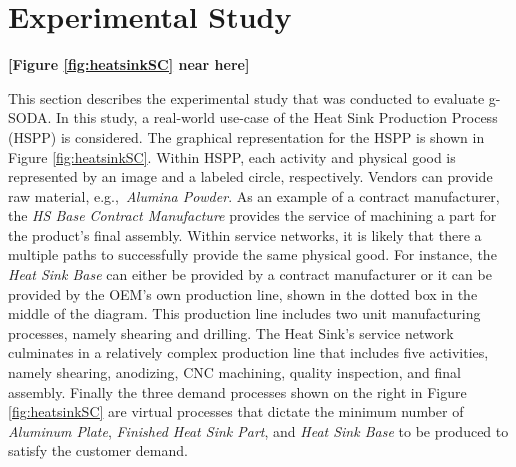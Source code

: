 \documentclass[a4paper, 12pt]{article} %
\begin{document}
\section{Experimental Study}
\label{sec:expResults}

\textbf{[Figure \ref{fig:heatsinkSC} near here]}


This section describes the experimental study that was conducted to evaluate g-SODA. 
In this study, a real-world use-case of the Heat Sink Production Process (HSPP) is considered.
The graphical representation for the HSPP is shown in Figure \ref{fig:heatsinkSC}.
Within HSPP, each activity and physical good is represented by an image and a labeled circle, respectively.  Vendors can provide raw material, e.g.,\ \textit{Alumina Powder}.
As an example of a contract manufacturer, the \textit{HS Base Contract Manufacture} provides the service of machining a part for the product's final assembly.  
Within service networks, it is likely that there a multiple paths to successfully provide the same physical good. 
For instance, the \textit{Heat Sink Base} can either be provided by a contract manufacturer or it can be provided by the OEM's own production line, shown in the dotted box in the middle of the diagram.  This production line includes two unit manufacturing processes, namely shearing and drilling.  
The Heat Sink's service network culminates in a relatively complex production line that includes five activities, namely shearing, anodizing, CNC machining, quality inspection, and final assembly. 
Finally the three demand processes shown on the right in Figure \ref{fig:heatsinkSC} are virtual processes that dictate the minimum number of \textit{Aluminum Plate}, \textit{Finished Heat Sink Part}, and \textit{Heat Sink Base} to be produced to satisfy the customer demand. 
\end{document}
